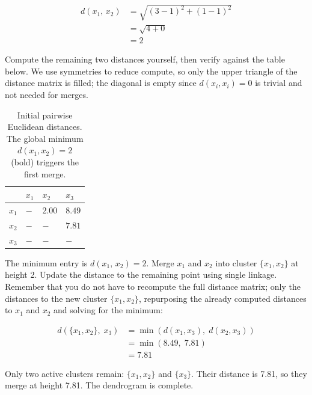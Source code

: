 \begin{align*}
    d(x_1,\,x_2) &= \sqrt{(3-1)^2 + (1-1)^2} \\
                 &= \sqrt{4 + 0} \\
                 &= 2
\end{align*}

Compute the remaining two distances yourself, then verify against the table below.
We use symmetries to reduce compute, so only the upper triangle of the distance matrix is filled; 
the diagonal is empty since $d(x_i, x_i) = 0$ is trivial and not needed for merges.

\vspace{2.5em}

\begin{table}[ht]
\centering
\begin{tabular}{p{}p{}p{}p{}}
    \toprule
    & \textbf{$x_1$} & \textbf{$x_2$} & \textbf{$x_3$} \\
    \midrule
    $x_1$ & $-$  & $\mathbf{2.00}$ & $8.49$ \\
    $x_2$ & $-$ & $-$  & $7.81$ \\
    $x_3$ & $-$ & $-$ & $-$ \\
    \bottomrule
\end{tabular}
\vspace{2em}
\caption{Initial pairwise Euclidean distances. The global minimum $d(x_1,x_2){=}2$ (bold) triggers the first merge.}
\label{tab:hc_distances}
\end{table}

The minimum entry is $d(x_1,\,x_2){=}2$.
Merge $x_1$ and $x_2$ into cluster $\{x_1,x_2\}$ at height 2.
Update the distance to the remaining point using single linkage. 
Remember that you do not have to recompute the full distance matrix; 
only the distances to the new cluster $\{x_1,x_2\}$, repurposing the already computed distances 
to $x_1$ and $x_2$ and solving for the minimum:

\begin{align*}
    d\!\left(\{x_1,x_2\},\; x_3\right) &= \min\!\left(d(x_1,x_3),\; d(x_2,x_3)\right) \\
                                        &= \min(8.49,\; 7.81) \\
                                        &= 7.81
\end{align*}

Only two active clusters remain: $\{x_1,x_2\}$ and $\{x_3\}$.
Their distance is 7.81, so they merge at height 7.81.
The dendrogram is complete.

